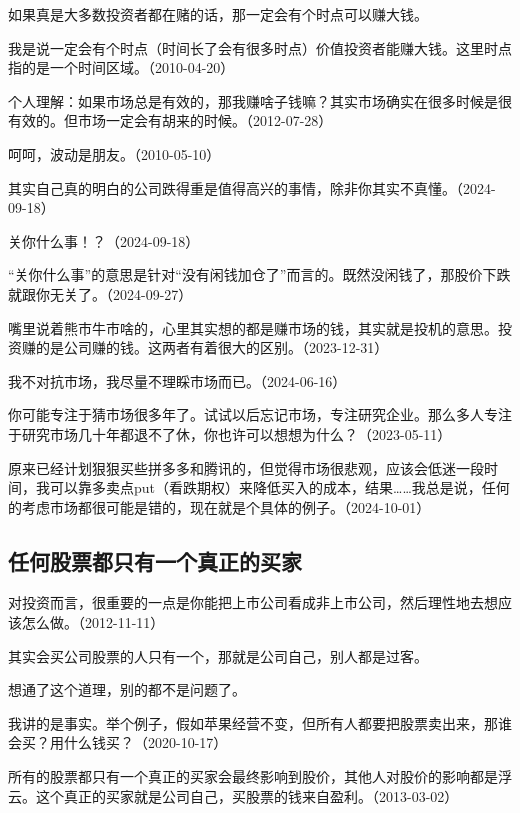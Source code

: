 如果真是大多数投资者都在赌的话，那一定会有个时点可以赚大钱。

我是说一定会有个时点（时间长了会有很多时点）价值投资者能赚大钱。这里时点指的是一个时间区域。（2010-04-20）


个人理解：如果市场总是有效的，那我赚啥子钱嘛？其实市场确实在很多时候是很有效的。但市场一定会有胡来的时候。（2012-07-28）

呵呵，波动是朋友。（2010-05-10）

其实自己真的明白的公司跌得重是值得高兴的事情，除非你其实不真懂。（2024-09-18）


关你什么事！？（2024-09-18）

“关你什么事”的意思是针对“没有闲钱加仓了”而言的。既然没闲钱了，那股价下跌就跟你无关了。（2024-09-27）

嘴里说着熊市牛市啥的，心里其实想的都是赚市场的钱，其实就是投机的意思。投资赚的是公司赚的钱。这两者有着很大的区别。（2023-12-31）

我不对抗市场，我尽量不理睬市场而已。（2024-06-16）

你可能专注于猜市场很多年了。试试以后忘记市场，专注研究企业。那么多人专注于研究市场几十年都退不了休，你也许可以想想为什么？（2023-05-11）

原来已经计划狠狠买些拼多多和腾讯的，但觉得市场很悲观，应该会低迷一段时间，我可以靠多卖点put（看跌期权）来降低买入的成本，结果……我总是说，任何的考虑市场都很可能是错的，现在就是个具体的例子。（2024-10-01）

\subsection{任何股票都只有一个真正的买家}

对投资而言，很重要的一点是你能把上市公司看成非上市公司，然后理性地去想应该怎么做。（2012-11-11）

其实会买公司股票的人只有一个，那就是公司自己，别人都是过客。

想通了这个道理，别的都不是问题了。

我讲的是事实。举个例子，假如苹果经营不变，但所有人都要把股票卖出来，那谁会买？用什么钱买？（2020-10-17）

所有的股票都只有一个真正的买家会最终影响到股价，其他人对股价的影响都是浮云。这个真正的买家就是公司自己，买股票的钱来自盈利。（2013-03-02）

